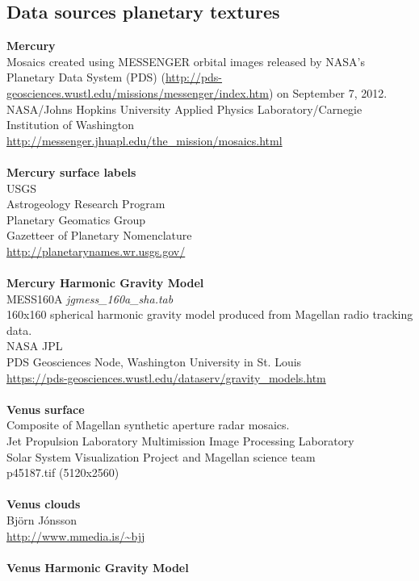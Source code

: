 \documentclass[Orbiter User Manual.tex]{subfiles}
\begin{document}
\subsection{Data sources planetary textures}
\textbf{Mercury}\\
Mosaics created using MESSENGER orbital images released by NASA's Planetary Data System (PDS) (\url{http://pds-geosciences.wustl.edu/missions/messenger/index.htm}) on September 7, 2012.\\
NASA/Johns Hopkins University Applied Physics Laboratory/Carnegie Institution of Washington\\
\url{http://messenger.jhuapl.edu/the_mission/mosaics.html}\\
\\
\textbf{Mercury surface labels}\\
USGS\\
Astrogeology Research Program\\
Planetary Geomatics Group\\
Gazetteer of Planetary Nomenclature\\
\url{http://planetarynames.wr.usgs.gov/}\\
\\
\textbf{Mercury Harmonic Gravity Model}\\
MESS160A	\textit{jgmess\_160a\_sha.tab}\\
160x160 spherical harmonic gravity model produced from Magellan radio tracking data.\\
NASA JPL\\
PDS Geosciences Node, Washington University in St. Louis\\
\url{https://pds-geosciences.wustl.edu/dataserv/gravity_models.htm}\\
\\
\textbf{Venus surface}\\
Composite of Magellan synthetic aperture radar mosaics.\\
Jet Propulsion Laboratory Multimission Image Processing Laboratory\\
Solar System Visualization Project and Magellan science team\\
p45187.tif (5120x2560)\\
\\
\textbf{Venus clouds}\\
Björn Jónsson\\
\url{http://www.mmedia.is/~bjj}\\
\\
\textbf{Venus Harmonic Gravity Model}\\
\end{document}
